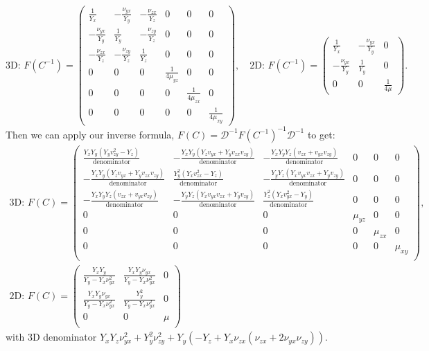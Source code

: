 \documentclass[10pt]{article}
\begin{document}
$$
\text{3D: } F(C^{-1}) =
\begin{pmatrix}
    \frac{1}{Y_x} & -\frac{\nu_{yx}}{Y_y} & -\frac{\nu_{zx}}{Y_z} & 0 & 0 & 0 \\
    -\frac{\nu_{yx}}{Y_y} & \frac{1}{Y_y} & -\frac{\nu_{zy}}{Y_z} & 0 & 0 & 0 \\
    -\frac{\nu_{zx}}{Y_z} & -\frac{\nu_{zy}}{Y_z} & \frac{1}{Y_z} & 0 & 0 & 0 \\
    0 & 0 & 0 & \frac{1}{4 \mu_{yz}} & 0 & 0 \\
    0 & 0 & 0 & 0 & \frac{1}{4 \mu_{zx}} & 0 \\
    0 & 0 & 0 & 0 & 0 & \frac{1}{4 \mu_{xy}}
\end{pmatrix}, \quad
\text{2D: } F(C^{-1}) = 
\begin{pmatrix}
    \frac{1}{Y_x} & -\frac{\nu_{yx}}{Y_y} & 0 \\
    -\frac{\nu_{yx}}{Y_y} & \frac{1}{Y_y}  & 0 \\
    0 & 0 & \frac{1}{4 \mu}
\end{pmatrix}.
$$
Then we can apply our inverse formula, 
$
F(C) = \mathscr{D}^{-1} F\left(C^{-1}\right)^{-1} \mathscr{D}^{-1}$ to get:
\begin{gather*}
\text{3D: } F(C) =
\begin{pmatrix}
 \frac{Y_{x} Y_{y} \left(Y_{y} v_{zy}^2-Y_{z}\right)}{\text{denominator}} & -\frac{Y_{x} Y_{y} (Y_{z} v_{yx}+Y_{y} v_{zx} v_{zy})}{\text{denominator}} & -\frac{Y_{x} Y_{y} Y_{z} (v_{zx}+v_{yx} v_{zy})}{\text{denominator}} & 0 & 0 & 0 \\
 -\frac{Y_{x} Y_{y} (Y_{z} v_{yx}+Y_{y} v_{zx} v_{zy})}{\text{denominator}} & \frac{Y_{y}^2 \left(Y_{x} v_{zx}^2-Y_{z}\right)}{\text{denominator}} & -\frac{Y_{y} Y_{z} (Y_{x} v_{yx} v_{zx}+Y_{y} v_{zy})}{\text{denominator}} & 0 & 0 & 0 \\
 -\frac{Y_{x} Y_{y} Y_{z} (v_{zx}+v_{yx} v_{zy})}{\text{denominator}} & -\frac{Y_{y} Y_{z} (Y_{x} v_{yx} v_{zx}+Y_{y} v_{zy})}{\text{denominator}} & \frac{Y_{z}^2 \left(Y_{x} v_{yx}^2-Y_{y}\right)}{\text{denominator}} & 0 & 0 & 0 \\
 0 & 0 & 0 & \mu_{yz} & 0 & 0 \\
 0 & 0 & 0 & 0 & \mu_{zx} & 0 \\
 0 & 0 & 0 & 0 & 0 & \mu_{xy} \\
\end{pmatrix}, \\
\text{2D: } F(C) =
\begin{pmatrix}
    \frac{Y_{x} Y_{y}}{Y_{y}-Y_{x} \nu_{yx}^2} &
    \frac{Y_{x} Y_{y} \nu_{yx}}{Y_{y}-Y_{x} \nu_{yx}^2}
    & 0 \\
     \frac{Y_{x} Y_{y} \nu_{yx}}{Y_{y}-Y_{x} \nu_{yx}^2}
     & \frac{Y_{y}^2}{Y_{y}-Y_{x} \nu_{yx}^2} & 0 \\
      0 & 0 & \mu \\
 \end{pmatrix}
\end{gather*}
with 3D denominator $Y_x Y_z \nu_{yx}^2 + Y_y^2 \nu_{zy}^2 + Y_y (-Y_z + Y_x
\nu_{zx} (\nu_{zx} + 2 \nu_{yx} \nu_{zy}))$.
\end{document}
